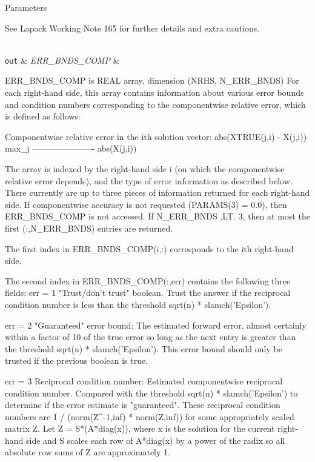 \begin{DoxyParams}[1]{Parameters}
\begin{DoxyVerb}
     See Lapack Working Note 165 for further details and extra
     cautions.\end{DoxyVerb}
\\
\hline
\mbox{\tt out}  & {\em E\+R\+R\+\_\+\+B\+N\+D\+S\+\_\+\+C\+O\+M\+P} & \begin{DoxyVerb}          ERR_BNDS_COMP is REAL array, dimension (NRHS, N_ERR_BNDS)
     For each right-hand side, this array contains information about
     various error bounds and condition numbers corresponding to the
     componentwise relative error, which is defined as follows:

     Componentwise relative error in the ith solution vector:
                    abs(XTRUE(j,i) - X(j,i))
             max_j ----------------------
                         abs(X(j,i))

     The array is indexed by the right-hand side i (on which the
     componentwise relative error depends), and the type of error
     information as described below. There currently are up to three
     pieces of information returned for each right-hand side. If
     componentwise accuracy is not requested (PARAMS(3) = 0.0), then
     ERR_BNDS_COMP is not accessed.  If N_ERR_BNDS .LT. 3, then at most
     the first (:,N_ERR_BNDS) entries are returned.

     The first index in ERR_BNDS_COMP(i,:) corresponds to the ith
     right-hand side.

     The second index in ERR_BNDS_COMP(:,err) contains the following
     three fields:
     err = 1 "Trust/don't trust" boolean. Trust the answer if the
              reciprocal condition number is less than the threshold
              sqrt(n) * slamch('Epsilon').

     err = 2 "Guaranteed" error bound: The estimated forward error,
              almost certainly within a factor of 10 of the true error
              so long as the next entry is greater than the threshold
              sqrt(n) * slamch('Epsilon'). This error bound should only
              be trusted if the previous boolean is true.

     err = 3  Reciprocal condition number: Estimated componentwise
              reciprocal condition number.  Compared with the threshold
              sqrt(n) * slamch('Epsilon') to determine if the error
              estimate is "guaranteed". These reciprocal condition
              numbers are 1 / (norm(Z^{-1},inf) * norm(Z,inf)) for some
              appropriately scaled matrix Z.
              Let Z = S*(A*diag(x)), where x is the solution for the
              current right-hand side and S scales each row of
              A*diag(x) by a power of the radix so all absolute row
              sums of Z are approximately 1.


\end{DoxyVerb}
\end{DoxyParams}
